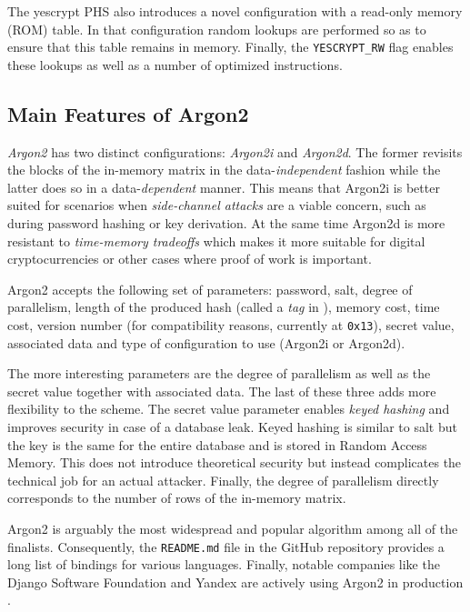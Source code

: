 The yescrypt PHS also introduces a novel configuration with a read-only memory (ROM) table. In that configuration random lookups are performed so as to ensure that this table remains in memory. Finally, the \texttt{YESCRYPT\_RW} flag enables these lookups as well as a number of optimized instructions.

\subsection{Main Features of Argon2}
\label{sec:argon2}

\emph{Argon2} \cite{biryukov:2015:argon2} has two distinct configurations: \emph{Argon2i} and \emph{Argon2d}. The former revisits the blocks of the in-memory matrix in the data-\emph{independent} fashion while the latter does so in a data-\emph{dependent} manner. This means that Argon2i is better suited for scenarios when \emph{side-channel attacks} \cite{Caddy2011} are a viable concern, such as during password hashing or key derivation. At the same time Argon2d is more resistant to \emph{time-memory tradeoffs} which makes it more suitable for digital cryptocurrencies or other cases where proof of work is important.

Argon2 accepts the following set of parameters: password, salt, degree of parallelism, length of the produced hash (called a \emph{tag} in \cite{biryukov:2015:argon2}), memory cost, time cost, version number (for compatibility reasons, currently at \texttt{0x13}), secret value, associated data and type of configuration to use (Argon2i or Argon2d).

The more interesting parameters are the degree of parallelism as well as the secret value together with associated data. The last of these three adds more flexibility to the scheme. The secret value parameter enables \emph{keyed hashing} \cite{223865} and improves security in case of a database leak. Keyed hashing is similar to salt but the key is the same for the entire database and is stored in Random Access Memory. This does not introduce theoretical security but instead complicates the technical job for an actual attacker. Finally, the degree of parallelism directly corresponds to the number of rows of the in-memory matrix.

Argon2 is arguably the most widespread and popular algorithm among all of the finalists. Consequently, the \texttt{README.md} file in the GitHub repository \cite{github:2017:argon2} provides a long list of bindings for various languages. Finally, notable companies like the Django Software Foundation and Yandex are actively using Argon2 in production \cite{django:2017:argon2, github:2017:argonische}.

